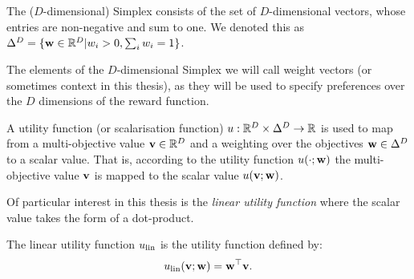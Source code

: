     \begin{defn}
        \label{def:simplex}
        \label{def:weight}
        \label{def:context}
        The \textnormal{($D$-dimensional) Simplex} consists of the set of $D$-dimensional vectors, whose entries are non-negative and sum to one. We denoted this as $\Delta^D = \{\mathbf{w}\in\mathbb{R}^D|w_i > 0, \sum_i w_i = 1\}$.

        The elements of the $D$-dimensional Simplex we will call \textnormal{weight vectors} (or sometimes \textnormal{context} in this thesis), as they will be used to specify preferences over the $D$ dimensions of the reward function.
    \end{defn}

    \begin{defn}
        \label{def:utility_fn}
        \label{def:scalarisation_fn}
        A \textnormal{utility function} (or \textnormal{scalarisation function}) $u:\mathbb{R}^D\times\Delta^D \rightarrow \mathbb{R}$ is used to map from a multi-objective value $\mathbf{v}\in\mathbb{R}^D$ and a weighting over the objectives $\mathbf{w}\in\Delta^D$ to a scalar value. That is, according to the utility function $u(\cdot;\mathbf{w})$ the multi-objective value $\mathbf{v}$ is mapped to the scalar value $u(\mathbf{v};\mathbf{w})$.
    \end{defn}



    Of particular interest in this thesis is the \textit{linear utility function} where the scalar value takes the form of a dot-product.
    
    \begin{defn}
        \label{def:linear_utility_fn}
        \label{def:linear_scalarisation_fn}
        The \textnormal{linear utility function} $u_{{\textnormal{lin}}}$ is the utility function defined by:
        \begin{align}
            u_{{\textnormal{lin}}}(\mathbf{v};\mathbf{w}) = \mathbf{w}^\top \mathbf{v}.
        \end{align}
    \end{defn}

